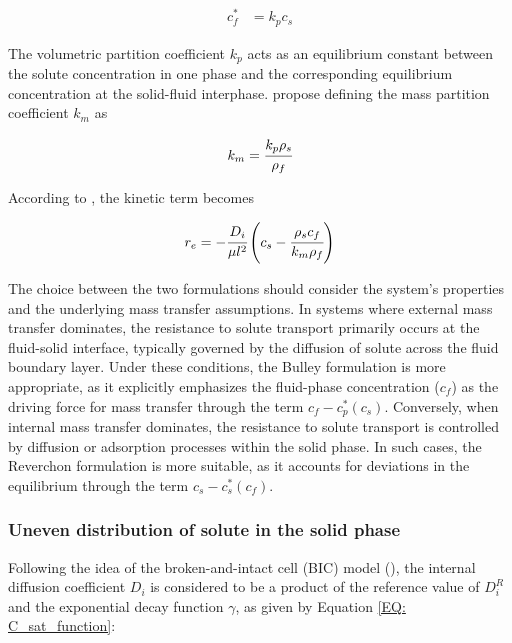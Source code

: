 \documentclass[a4paper,fleqn]{cas-dc}
\begin{document}
	{\footnotesize
		\begin{align} \label{Linear_equilibirum}
			c_f^* &= k_p c_s
	\end{align} }
	
	The volumetric partition coefficient $k_p$ acts as an equilibrium constant between the solute concentration in one phase and the corresponding equilibrium concentration at the solid-fluid interphase. \citet{Spiro2007} propose defining the mass partition coefficient $k_m$ as 
	
	{\footnotesize
		\begin{align}
			k_m = \cfrac{k_p \rho_s}{\rho_f}
	\end{align} }
	
	According to \citet{Reverchon1996}, the kinetic term becomes
	
	{\footnotesize
		\begin{equation}
			\label{Model_kinetic_no_sat}
			r_e = -\cfrac{D_i}{ \mu l^2 } \left(c_s - \cfrac{\rho_s c_f}{k_m \rho_f} \right)
	\end{equation} }

	The choice between the two formulations should consider the system's properties and the underlying mass transfer assumptions. In systems where external mass transfer dominates, the resistance to solute transport primarily occurs at the fluid-solid interface, typically governed by the diffusion of solute across the fluid boundary layer. Under these conditions, the Bulley formulation is more appropriate, as it explicitly emphasizes the fluid-phase concentration ($c_f$) as the driving force for mass transfer through the term $c_f - c_p^*(c_s)$. Conversely, when internal mass transfer dominates, the resistance to solute transport is controlled by diffusion or adsorption processes within the solid phase. In such cases, the Reverchon formulation is more suitable, as it accounts for deviations in the equilibrium through the term $c_s - c_s^*(c_f)$.
	
	\subsubsection{Uneven distribution of solute in the solid phase} \label{CH: Gamma_Function}
	
	Following the idea of the broken-and-intact cell (BIC) model (\citet{Sovova2017}), the internal diffusion coefficient $D_i$ is considered to be a product of the reference value of $D_i^R$ and the exponential decay function $\gamma$, as given by Equation \ref{EQ: C_sat_function}:
	
\end{document}
